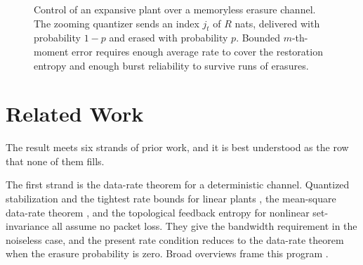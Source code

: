\documentclass[journal]{IEEEtran}
\theoremstyle{definition}
\theoremstyle{remark}
\begin{document}
\begin{figure}[t]
\centering
{}
\caption{Control of an expansive plant over a memoryless erasure channel. The zooming quantizer sends an index
$j_t$ of $R$ nats, delivered with probability $1-p$ and erased with probability $p$. Bounded $m$-th-moment error
requires enough average rate to cover the restoration entropy and enough burst reliability to survive runs of
erasures.}
\label{fig:model2}
\end{figure}

\section{Related Work}\label{sec:related}
The result meets six strands of prior work, and it is best understood as the row that none of them fills.

The first strand is the data-rate theorem for a deterministic channel. Quantized stabilization and the tightest
rate bounds for linear plants \cite{wongbrockett1999,nairevans2000,brockettliberzon2000,delchamps1990,fuxie2005},
the mean-square data-rate theorem \cite{tatikondamitter2004,nairevans2004}, and the topological feedback entropy
for nonlinear set-invariance \cite{nemm2004} all assume no packet loss. They give the bandwidth requirement in
the noiseless case, and the present rate condition reduces to the data-rate theorem when the erasure probability
is zero. Broad overviews frame this program \cite{nair2007overview,matveevsavkin2009,yukselbasar2013}.
\end{document}
